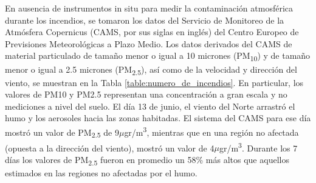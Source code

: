 En ausencia de instrumentos in situ para medir la contaminación atmosférica durante los incendios, se tomaron los datos del Servicio de Monitoreo de la Atmósfera Copernicus (CAMS, por sus siglas en inglés) del Centro Europeo de Previsiones Meteorológicas a Plazo Medio. Los datos derivados del CAMS de material particulado de tamaño menor o igual a 10 micrones (PM\textsubscript{10}) y de tamaño menor o igual a 2.5 micrones (PM\textsubscript{2.5}), así como de la velocidad y dirección del viento, se muestran en la Tabla \ref{table:numero_de_incendios}. En particular, los valores de PM10 y PM2.5 representan una concentración a gran escala y no mediciones a nivel del suelo. El día 13 de junio, el viento del Norte arrastró el humo y los aerosoles hacia las zonas habitadas. El sistema del CAMS para ese día mostró un valor de PM\textsubscript{2.5} de 9$\mu$gr/m\textsuperscript{3}, mientras que en una región no afectada (opuesta a la dirección del viento), mostró un valor de 4$\mu$gr/m\textsuperscript{3}. Durante los 7 días los valores de PM\textsubscript{2.5} fueron en promedio un 58\% más altos que aquellos estimados en las regiones no afectadas por el humo.

